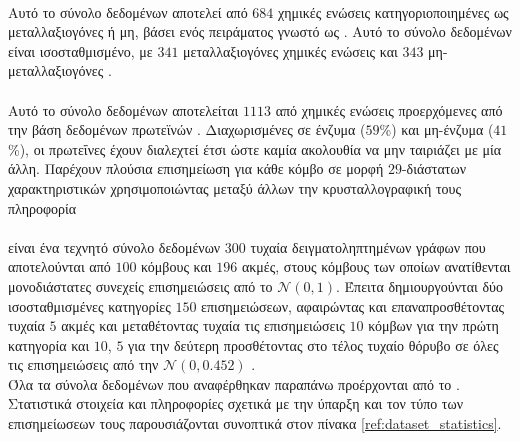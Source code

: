 \paragraph*{} Αυτό το σύνολο δεδομένων αποτελεί από $684$ χημικές ενώσεις κατηγοριοποιημένες ως μεταλλαξιογόνες ή μη, βάσει ενός πειράματος γνωστό ως .
Αυτό το σύνολο δεδομένων είναι ισοσταθμισμένο, με $341$ μεταλλαξιογόνες χημικές ενώσεις και $343$ μη-μεταλλαξιογόνες \cite{mahe2009graph, Neumann2016}.

\paragraph*{} Αυτό το σύνολο δεδομένων αποτελείται $1113$ από χημικές ενώσεις προερχόμενες από την βάση δεδομένων πρωτεϊνών .
Διαχωρισμένες σε ένζυμα ($59$\%) και μη-ένζυμα ($41$\%), οι πρωτεΐνες έχουν διαλεχτεί έτσι ώστε καμία ακολουθία να μην ταιριάζει με μία άλλη.
Παρέχουν πλούσια επισημείωση για κάθε κόμβο σε μορφή $29$-διάστατων χαρακτηριστικών χρησιμοποιώντας μεταξύ άλλων την κρυσταλλογραφική τους πληροφορία \cite{DobsonDoig03, borgwardt2005protein, Neumann2016}

\paragraph*{} είναι ένα τεχνητό σύνολο δεδομένων $300$ τυχαία δειγματοληπτημένων γράφων που αποτελούνται από $100$ κόμβους και $196$ ακμές, στους κόμβους των οποίων ανατίθενται μονοδιάστατες συνεχείς επισημειώσεις από το $\mathcal{N}(0, 1)$.
Έπειτα δημιουργούνται δύο ισοσταθμισμένες κατηγορίες $150$ επισημειώσεων, αφαιρώντας και επαναπροσθέτοντας τυχαία $5$ ακμές και μεταθέτοντας τυχαία τις επισημειώσεις $10$ κόμβων για την πρώτη κατηγορία και $10$, $5$ για την δεύτερη προσθέτοντας στο τέλος τυχαίο θόρυβο σε όλες τις επισημειώσεις από την $\mathcal{N}(0, 0.452)$ \cite{Feragen13}.
\newline \\
Όλα τα σύνολα δεδομένων που αναφέρθηκαν παραπάνω προέρχονται από το \cite{KKMMN2016}.
Στατιστικά στοιχεία και πληροφορίες σχετικά με την ύπαρξη και τον τύπο των επισημείωσεων τους παρουσιάζονται συνοπτικά στον πίνακα \ref{ref:dataset_statistics}.

